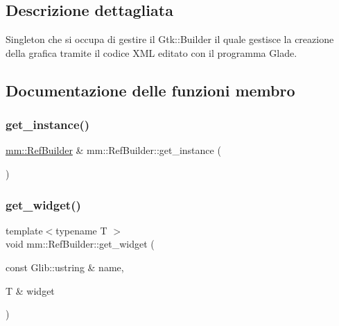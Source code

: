 \subsection{Descrizione dettagliata}
Singleton che si occupa di gestire il Gtk\+::\+Builder il quale gestisce la creazione della grafica tramite il codice X\+ML editato con il programma Glade. 

\subsection{Documentazione delle funzioni membro}
\mbox{\label{classmm_1_1_ref_builder_a1c46de2b1ff68aebfc85692a99827753}} 
\subsubsection{\texorpdfstring{get\+\_\+instance()}{get\_instance()}}
{\footnotesize\ttfamily \hyperlink{classmm_1_1_ref_builder}{mm\+::\+Ref\+Builder} \& mm\+::\+Ref\+Builder\+::get\+\_\+instance (\begin{DoxyParamCaption}{ }\end{DoxyParamCaption})\hspace{0.3cm}{\ttfamily [static]}}

\mbox{\label{classmm_1_1_ref_builder_a67812973516cbeddf488360424685153}} 
\subsubsection{\texorpdfstring{get\+\_\+widget()}{get\_widget()}}
{\footnotesize\ttfamily template$<$typename T $>$ \\
void mm\+::\+Ref\+Builder\+::get\+\_\+widget (\begin{DoxyParamCaption}\item[{const Glib\+::ustring \&}]{name,  }\item[{T \&}]{widget }\end{DoxyParamCaption})\hspace{0.3cm}{\ttfamily [inline]}}

